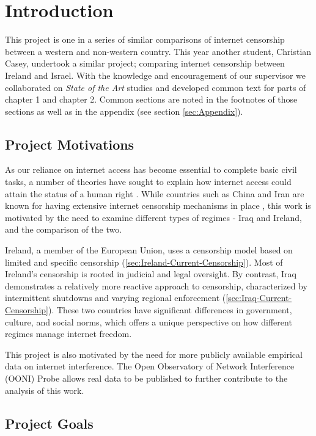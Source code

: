 \chapter{Introduction}

This project is one in a series of similar comparisons of internet censorship between a western and non-western country. This year another student, Christian Casey, undertook a similar project; comparing internet censorship between Ireland and Israel. With the knowledge and encouragement of our supervisor we collaborated on \textit{State of the Art} studies and developed common text for parts of chapter 1 and chapter 2. Common sections are noted in the footnotes of those sections as well as in the appendix (see section \ref{sec:Appendix}).

\section{Project Motivations}

As our reliance on internet access has become essential to complete basic civil tasks, a number of theories have sought to explain how internet access could attain the status of a human right \cite{shandler2019reality}. While countries such as China and Iran are known for having extensive internet censorship mechanisms in place \cite{comparitechInternetCensorship}, this work is motivated by the need to examine different types of regimes - Iraq and Ireland, and the comparison of the two.

Ireland, a member of the European Union, uses a censorship model based on limited and specific censorship (\ref{sec:Ireland-Current-Censorship}). Most of Ireland's censorship is rooted in judicial and legal oversight. By contrast, Iraq demonstrates a relatively more reactive approach to censorship, characterized by intermittent shutdowns and varying regional enforcement (\ref{sec:Iraq-Current-Censorship}). These two countries have significant differences in government, culture, and social norms, which offers a unique perspective on how different regimes manage internet freedom.

This project is also motivated by the need for more publicly available empirical data on internet interference. The Open Observatory of Network Interference (OONI) Probe allows real data to be published to further contribute to the analysis of this work.

\section{Project Goals}

